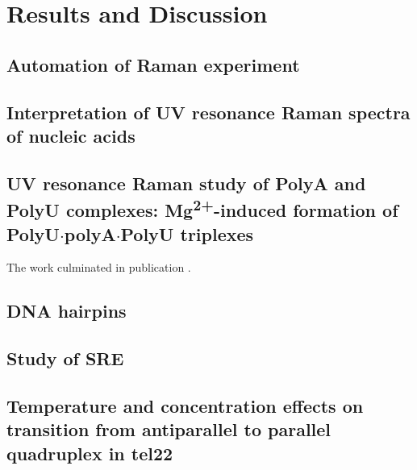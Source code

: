 \chapter{Results and Discussion}



\section{Automation of Raman experiment}




\section{Interpretation of UV resonance Raman spectra of nucleic acids}

\section[\texorpdfstring{%
    UV resonance Raman study of PolyA and PolyU complexes:\\
		Mg\textsuperscript{2+}\babelhyphen{nobreak}induced formation of
		PolyU$\cdot$polyA$\cdot$PolyU triplexes
}{%
    UV resonance Raman study of PolyA and PolyU complexes:
		Mg\texttwosuperior\textplussuperior-induced formation of PolyU·polyA·PolyU
		triplexes
}]{%
    UV resonance Raman study of PolyA and PolyU complexes:
		Mg\textsuperscript{2+}-induced formation of PolyU$\cdot$polyA$\cdot$PolyU
		triplexes
}%

The work culminated in publication \textcite{Klener2015}.

\section{DNA hairpins}

\section{Study of SRE}

\section[Temperature and concentration effects on transition from antiparallel to parallel quadruplex in tel22]{Temperature and concentration effects on transition from antiparallel to parallel\\ quadruplex in tel22}

